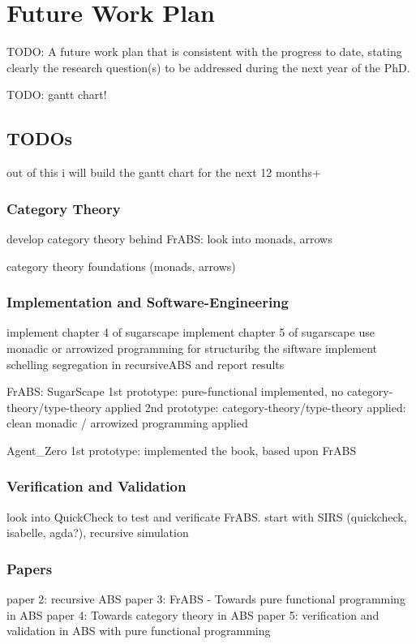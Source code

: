 \section{Future Work Plan}
TODO: A future work plan that is consistent with the progress to date, stating clearly the research question(s) to be addressed during the next year of the PhD.

TODO: gantt chart!

\subsection{TODOs}
out of this i will build the gantt chart for the next 12 months+

\subsubsection{Category Theory}
develop category theory behind FrABS: look into monads, arrows

category theory foundations (monads, arrows)

\subsubsection{Implementation and Software-Engineering}
implement chapter 4 of sugarscape
implement chapter 5 of sugarscape
use monadic or arrowized programming for structuribg the siftware
implement schelling segregation in recursiveABS and report results

FrABS: SugarScape
1st prototype: pure-functional implemented, no category-theory/type-theory applied
2nd prototype: category-theory/type-theory applied: clean monadic / arrowized programming applied

Agent\_Zero
1st prototype: implemented the book, based upon FrABS 

\subsubsection{Verification and Validation}
look into QuickCheck to test and verificate FrABS. start with SIRS
(quickcheck, isabelle, agda?), recursive simulation

\subsubsection{Papers}
paper 2: recursive ABS
paper 3: FrABS - Towards pure functional programming in ABS
paper 4: Towards category theory in ABS
paper 5: verification and validation in ABS with pure functional programming


